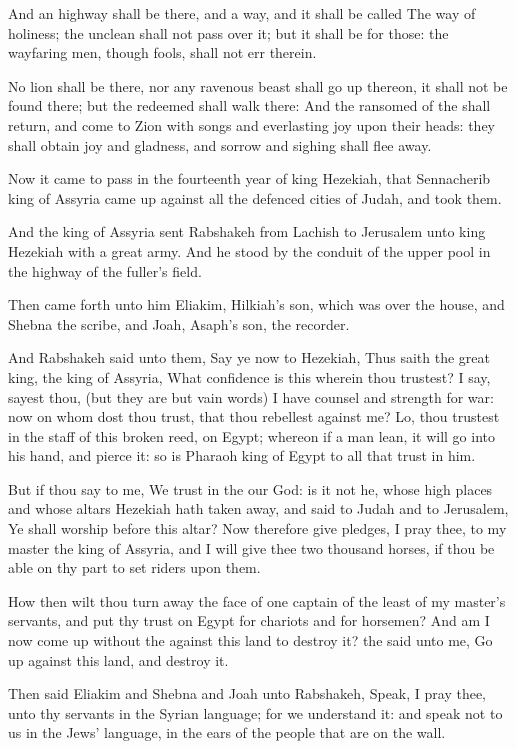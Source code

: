 \Verse And an highway shall be there, and a way, and it shall be called The way of holiness; the unclean shall not pass over it; but it shall be for those: the wayfaring men, though fools, shall not err therein.

\Verse No lion shall be there, nor any ravenous beast shall go up thereon, it shall not be found there; but the redeemed shall walk there: \Verse And the ransomed of the \LORD shall return, and come to Zion with songs and everlasting joy upon their heads: they shall obtain joy and gladness, and sorrow and sighing shall flee away.


\Chapter
\Verse Now it came to pass in the fourteenth year of king Hezekiah, that Sennacherib king of Assyria came up against all the defenced cities of Judah, and took them.

\Verse And the king of Assyria sent Rabshakeh from Lachish to Jerusalem unto king Hezekiah with a great army. And he stood by the conduit of the upper pool in the highway of the fuller's field.

\Verse Then came forth unto him Eliakim, Hilkiah's son, which was over the house, and Shebna the scribe, and Joah, Asaph's son, the recorder.

\Verse And Rabshakeh said unto them, Say ye now to Hezekiah, Thus saith the great king, the king of Assyria, What confidence is this wherein thou trustest?  \Verse I say, sayest thou, (but they are but vain words) I have counsel and strength for war: now on whom dost thou trust, that thou rebellest against me?  \Verse Lo, thou trustest in the staff of this broken reed, on Egypt; whereon if a man lean, it will go into his hand, and pierce it: so is Pharaoh king of Egypt to all that trust in him.

\Verse But if thou say to me, We trust in the \LORD our God: is it not he, whose high places and whose altars Hezekiah hath taken away, and said to Judah and to Jerusalem, Ye shall worship before this altar?  \Verse Now therefore give pledges, I pray thee, to my master the king of Assyria, and I will give thee two thousand horses, if thou be able on thy part to set riders upon them.

\Verse How then wilt thou turn away the face of one captain of the least of my master's servants, and put thy trust on Egypt for chariots and for horsemen?  \Verse And am I now come up without the \LORD against this land to destroy it? the \LORD said unto me, Go up against this land, and destroy it.

\Verse Then said Eliakim and Shebna and Joah unto Rabshakeh, Speak, I pray thee, unto thy servants in the Syrian language; for we understand it: and speak not to us in the Jews' language, in the ears of the people that are on the wall.

